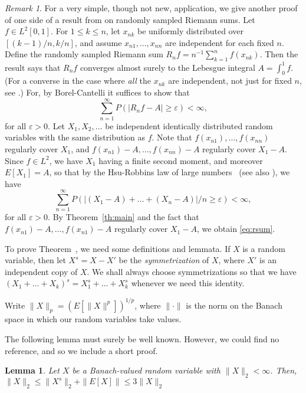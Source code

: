 \documentclass[12pt]{amsart}
\def\e{\varepsilon}
\def\oo{\infty}
\def\upref#1{\upn{\ref{#1}}}
\theoremstyle{definition}
\theoremstyle{plain}
\newtheorem{lem}{Lemma}
\theoremstyle{remark}
\newtheorem{rmrk}{Remark}
\begin{document}
\begin{rmrk}
For a very simple, though not new, application, we give another proof of one side of a
result from \cite{Pruss:Riemann} on randomly sampled Riemann sums.  Let $f\in L^2[0,1]$.
For $1\le k\le n$, let $x_{nk}$ be
uniformly distributed over $[(k-1)/n,k/n]$, and assume
$x_{n1},\dots,x_{nn}$ are independent for each fixed $n$.  Define the randomly sampled
Riemann sum $R_n f=n^{-1}\sum_{k=1}^n f(x_{nk})$.  Then the result says
that $R_n f$ converges almost surely to the Lebesgue integral
$A=\int_0^1 f$.  (For a converse in the case where {\em all}\/ the
$x_{nk}$ are independent, not just for fixed $n$, see
\cite{Pruss:Riemann}.)  For, by Borel-Cantelli it suffices to show that
\begin{equation}\label{eq:rsum}
        \sum_{n=1}^\oo P(|R_n f-A|\ge \e)<\oo,
\end{equation}
for all $\e>0$. Let $X_1,X_2,\dots$ be independent identically distributed
random variables with the same distribution as $f$. Note that
$f(x_{n1}),\dots,f(x_{nn})$ regularly cover $X_1$, and
$f(x_{n1})-A,\dots,f(x_{nn})-A$ regularly cover $X_1-A$.  Since $f\in
L^2$, we have $X_1$ having a finite second moment, and moreover
$E[X_1]=A$, so that by the
Hsu-Robbins law of large numbers~\cite{HsuRobbins} (see also
\cite{Erdos,Erdos:Two}), we have
$$
        \sum_{n=1}^\oo P(|(X_1-A)+\dots+(X_n-A)|/n \ge \e)<\oo,
$$
for all $\e>0$. By Theorem~\ref{th:main} and the fact that
$f(x_{n1})-A,\dots,f(x_{n1})-A$ regularly cover $X_1-A$, we obtain
\eqref{eq:rsum}.
\end{rmrk}

To prove Theorem~\upref{th:main}, we need some definitions and lemmata.
If $X$ is a random variable, then let $X^s=X-X'$ be the {\em
symmetrization}\/ of $X$, where $X'$ is an independent copy of $X$.  We
shall always choose symmetrizations so that we have
$(X_1+\dots+X_k)^s=X_1^s+\dots+X_k^s$ whenever we need this identity.

Write $\|X\|_p = (E[\|X\|^p])^{1/p}$, where $\| \cdot \|$ is the norm on
the Banach space in which our random variables take values.

The following lemma must surely be well known.  However, we
could find no reference, and so we include a short proof.

\begin{lem}\label{lem:disymm2}
        Let $X$ be a Banach-valued 
        random variable with $\| X \|_2<\oo$.
        Then, $\| X \|_2 \le \|X^s\|_2 + \|E [X]\| \le 3 \| X \|_2$
\end{lem}
\end{document}
